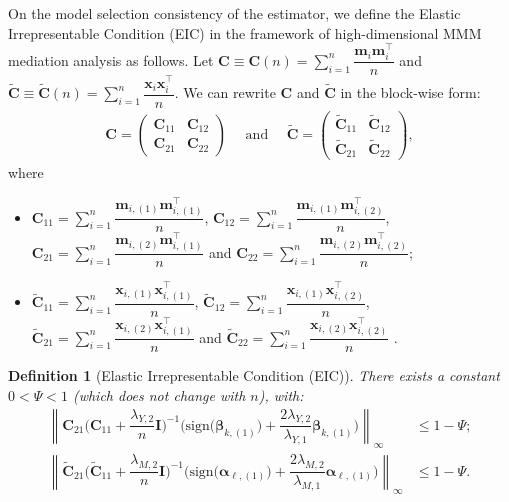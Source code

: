 \documentclass[
  12pt]{article}
\newtheorem{definition}[thm]{Definition}
\def\M{\mathbf{m}}
\def\X{\mathbf{x}}
\begin{document}
\bigskip

On the model selection consistency of the estimator, we define the Elastic Irrepresentable Condition (EIC) in the framework of high-dimensional MMM mediation analysis as follows.
Let $\mathbf{C} \equiv \mathbf{C}(n) =  \sum_{i=1}^{n}  \dfrac{ \M_{i}  \M_{i}^{\top} }{n}$ and $\widetilde{\mathbf{C}} \equiv \widetilde{\mathbf{C}}(n) =  \sum_{i=1}^{n}  \dfrac{ \X_{i}  \X_{i}^{\top} }{n}$. We can rewrite $\mathbf{C}$ and $\widetilde{\mathbf{C}}$ in the block-wise form:
\begin{align*}
	\mathbf{C} = \left( \begin{array}{cc}
		\mathbf{C}_{11}  &  \mathbf{C}_{12}
		\\
		\mathbf{C}_{21}  &  \mathbf{C}_{22}
	\end{array}
	\right)
    \quad \textrm{ and } \quad
    \widetilde{\mathbf{C}} = \left( \begin{array}{cc}
		\widetilde{\mathbf{C}}_{11}  &  \widetilde{\mathbf{C}}_{12}
		\\
		\widetilde{\mathbf{C}}_{21}  &  \widetilde{\mathbf{C}}_{22}
	\end{array}
	\right),
\end{align*}
where
\begin{itemize}
\item $\mathbf{C}_{11} =  \sum_{i=1}^{n}  \dfrac{\M_{i,(1)} \M_{i,(1)}^{\top} }{n}$, $\mathbf{C}_{12} =  \sum_{i=1}^{n}  \dfrac{\M_{i,(1)} \M_{i,(2)}^{\top} }{n}$, $\mathbf{C}_{21} =  \sum_{i=1}^{n}  \dfrac{\M_{i,(2)} \M_{i,(1)}^{\top} }{n}$ and $\mathbf{C}_{22} =  \sum_{i=1}^{n}  \dfrac{\M_{i,(2)} \M_{i,(2)}^{\top} }{n}$;
\item  $\widetilde{\mathbf{C}}_{11} =  \sum_{i=1}^{n}  \dfrac{\X_{i,(1)} \X_{i,(1)}^{\top} }{n}$, $\widetilde{\mathbf{C}}_{12} =  \sum_{i=1}^{n}  \dfrac{\X_{i,(1)} \X_{i,(2)}^{\top} }{n}$, $\widetilde{\mathbf{C}}_{21} =  \sum_{i=1}^{n}  \dfrac{\X_{i,(2)} \X_{i,(1)}^{\top} }{n}$ and $\widetilde{\mathbf{C}}_{22} =  \sum_{i=1}^{n}  \dfrac{\X_{i,(2)} \X_{i,(2)}^{\top} }{n}$ .
\end{itemize}
\begin{definition}[Elastic Irrepresentable Condition (EIC)]  
\em{
There exists a  constant $0 < \Psi < 1$ (which does not change with $n$), with:
\begin{align}
    \left\|  \mathbf{C}_{21} \Big(  \mathbf{C}_{11} + \dfrac{\lambda_{Y,2}}{n}\mathbf{I} \Big)^{-1}  \Big( \textrm{sign}\big( \bm{\beta}_{k , (1)} \big)  +  \dfrac{2 \lambda_{Y,2}}{\lambda_{Y,1}} \bm{\beta}_{k , (1)}  \Big) \right\|_{\infty}  &\leq  1 - \Psi;
\nonumber
\\
\left\|  \widetilde{\mathbf{C}}_{21} \Big(  \widetilde{\mathbf{C}}_{11} + \dfrac{\lambda_{M,2}}{n}\mathbf{I} \Big)^{-1}  \Big( \textrm{sign}\big( \bm{\alpha}_{\ell , (1)} \big)  +  \dfrac{2 \lambda_{M,2}}{\lambda_{M,1}} \bm{\alpha}_{\ell , (1)}  \Big) \right\|_{\infty}  &\leq  1 - \Psi.
\label{def:EIC:beta_k:inequa}
\end{align}
} \end{definition}
\end{document}
